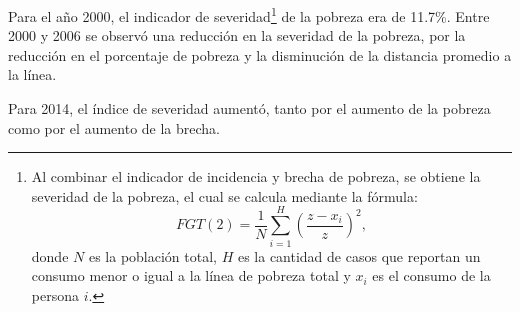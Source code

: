 Para el año 2000, el indicador de severidad\footnote{Al combinar el indicador de incidencia y brecha de pobreza, se obtiene la severidad de la pobreza, el cual se calcula mediante la fórmula: 
	\[ FGT(2)  =\frac {1} {N} \sum_{i=1}^H \left(\frac {z-x_i} {z}\right)^2,   \] donde $N$ es la población total, $H$  es la cantidad de casos que reportan un consumo  menor o igual a la línea de pobreza total y $x_i$ es el consumo de la persona $i$. } de la pobreza era de 11.7\%. 
Entre 2000 y 2006 se observó una reducción en la severidad de la pobreza, por la reducción en el porcentaje de pobreza y la disminución de la distancia promedio a la línea. 

Para 2014, el índice de severidad aumentó, tanto por el aumento de la pobreza como por el aumento de la brecha. 